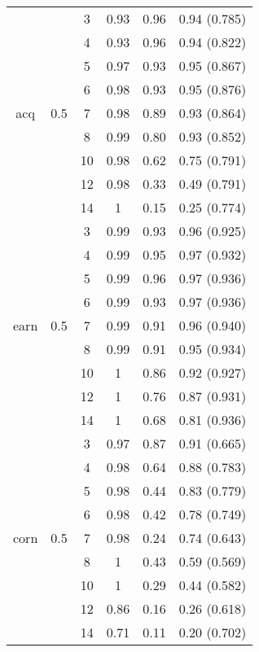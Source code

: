 \begin{table}[]
{\begin{tabular}{| c | c | c | c | c | c | }
	
				
		
		&& 3 & 0.93 & 0.96 & 0.94 (0.785)    \\ 
		&& 4 & 0.93 & 0.96 &  0.94  (0.822)  \\
			&& 5 & 0.97 & 0.93 & 0.95  (0.867)   \\ 
		&& 6 & 0.98 & 0.93 & 0.95 (0.876)    \\
	acq	&0.5& 7 & 0.98 & 0.89 & 0.93 (0.864)    \\
		&& 8 & 0.99 & 0.80 & 0.93  (0.852)   \\
		&& 10 & 0.98 & 0.62 & 0.75  (0.791)   \\
		&& 12 & 0.98 & 0.33 & 0.49  (0.791)   \\
		&& 14 & 1 & 0.15 & 0.25  (0.774)   \\ \hline
		
		
		
		&& 3 & 0.99 & 0.93 & 0.96  (0.925)   \\ 
	&& 4 & 0.99 & 0.95 &  0.97  (0.932) \\
	&	& 5 & 0.99 & 0.96 & 0.97   (0.936)  \\ 
	&& 6 & 0.99 & 0.93 & 0.97  (0.936)   \\
	earn&0.5& 7 & 0.99 & 0.91 & 0.96 (0.940)    \\
	&& 8 & 0.99 & 0.91 & 0.95  (0.934)   \\
	&& 10 & 1 & 0.86 & 0.92  (0.927)   \\
	&& 12 & 1 & 0.76 & 0.87  (0.931)   \\
	&& 14 & 1 & 0.68 & 0.81  (0.936)   \\ \hline
	
		
		
		
		&& 3 & 0.97 & 0.87 & 0.91  (0.665)   \\ 
		&& 4 & 0.98 & 0.64 & 0.88  (0.783)   \\ 
		&	& 5 & 0.98 & 0.44 &  0.83  (0.779)  \\ 
		&& 6 & 0.98 & 0.42 & 0.78   (0.749)  \\ 
		corn&0.5& 7 & 0.98 & 0.24 & 0.74  (0.643)  \\ 
		&& 8 & 1 & 0.43& 0.59  (0.569)   \\ 
		&& 10 & 1 & 0.29& 0.44  (0.582)   \\ 
		&& 12 & 0.86 & 0.16& 0.26  (0.618)   \\ 
		&& 14 & 0.71 & 0.11& 0.20  (0.702)   \\ 
								\hline
		

\end{tabular}}
\end{table}
